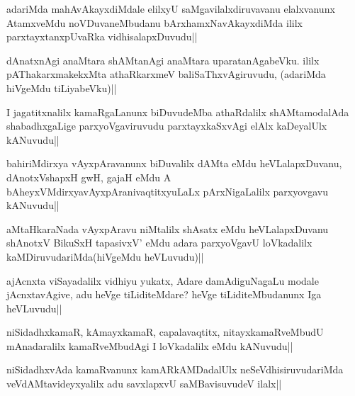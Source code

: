 \begin{artha}
adariMda mahAvAkayxdiMdale elilxyU saMgavilalxdiruvavanu elalxvanunx AtamxveMdu noVDuvaneMbudanu bArxhamxNavAkayxdiMda ililx parxtayxtanxpUvaRka vidhisalapxDuvudu||
\end{artha}

\begin{artha}
dAnatxnAgi anaMtara shAMtanAgi anaMtara uparatanAgabeVku. ililx pAThakarxmakekxMta athaRkarxmeV baliSaThxvAgiruvudu, (adariMda hiVgeMdu tiLiyabeVku)||
\end{artha}


\begin{artha}
I jagatitxnalilx kamaRgaLanunx biDuvudeMba athaRdalilx shAMtamodalAda shabadhxgaLige parxyoVgaviruvudu parxtayxkaSxvAgi elAlx kaDeyalUlx kANuvudu||
\end{artha}


\begin{artha}
bahiriMdirxya vAyxpAravanunx biDuvalilx dAMta eMdu heVLalapxDuvanu, dAnotxV\s shapxH gwH, gajaH eMdu A bAheyxVMdirxyavAyxpAranivaqtitxyuLaLx pArxNigaLalilx parxyovgavu kANuvudu||
\end{artha}


\begin{artha}
aMtaHkaraNada vAyxpAravu niMtalilx shAsatx eMdu heVLalapxDuvanu shAnotxV BikuSxH tapasivxV' eMdu adara parxyoVgavU loVkadalilx kaMDiruvudariMda(hiVgeMdu heVLuvudu)||
\end{artha}


\begin{artha}
ajAcnxta viSayadalilx vidhiyu yukatx, Adare damAdiguNagaLu modale jAcnxtavAgive, adu heVge tiLiditeMdare? heVge tiLiditeMbudanunx Iga heVLuvudu||
\end{artha}

\begin{artha}
niSidadhxkamaR, kAmayxkamaR, capalavaqtitx, nitayxkamaRveMbudU mAnadaralilx kamaRveMbudAgi I loVkadalilx eMdu kANuvudu||
\end{artha}

\begin{artha}
niSidadhxvAda kamaRvanunx kamARkAMDadalUlx neSeVdhisiruvudariMda veVdAMtavideyxyalilx adu savxlapxvU saMBavisuvudeV ilalx||
\end{artha}

